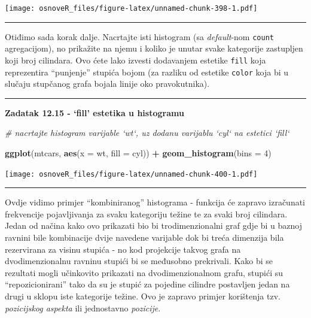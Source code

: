 \documentclass[]{book}
\newenvironment{Shaded}{\begin{snugshade}}{\end{snugshade}}
\newcommand{\KeywordTok}[1]{\textcolor[rgb]{0.13,0.29,0.53}{\textbf{#1}}}
\newcommand{\DataTypeTok}[1]{\textcolor[rgb]{0.13,0.29,0.53}{#1}}
\newcommand{\DecValTok}[1]{\textcolor[rgb]{0.00,0.00,0.81}{#1}}
\newcommand{\StringTok}[1]{\textcolor[rgb]{0.31,0.60,0.02}{#1}}
\newcommand{\CommentTok}[1]{\textcolor[rgb]{0.56,0.35,0.01}{\textit{#1}}}
\newcommand{\OperatorTok}[1]{\textcolor[rgb]{0.81,0.36,0.00}{\textbf{#1}}}
\newcommand{\NormalTok}[1]{#1}
\theoremstyle{definition}
\theoremstyle{definition}
\theoremstyle{definition}
\theoremstyle{remark}
\begin{document}
\texttt{[image: osnoveR\_files/figure-latex/unnamed-chunk-398-1.pdf]}

\begin{center}\rule{0.5\linewidth}{\linethickness}\end{center}

Otiđimo sada korak dalje. Nacrtajte isti histogram (sa
\emph{default}-nom \texttt{count} agregacijom), no prikažite na njemu i
koliko je unutar svake kategorije zastupljen koji broj cilindara. Ovo
ćete lako izvesti dodavanjem estetike \texttt{fill} koja reprezentira
``punjenje'' stupića bojom (za razliku od estetike \texttt{color} koja
bi u slučaju stupčanog grafa bojala linije oko pravokutnika).

\begin{center}\rule{0.5\linewidth}{\linethickness}\end{center}

\textbf{Zadatak 12.15 - `fill' estetika u histogramu}

\begin{Shaded}
\begin{Highlighting}[]
\CommentTok{# nacrtajte histogram varijable `wt`, uz dodanu varijablu `cyl` na estetici `fill`}
\end{Highlighting}
\end{Shaded}

\begin{Shaded}
\begin{Highlighting}[]
\KeywordTok{ggplot}\NormalTok{(mtcars, }\KeywordTok{aes}\NormalTok{(}\DataTypeTok{x =}\NormalTok{ wt, }\DataTypeTok{fill =}\NormalTok{ cyl)) }\OperatorTok{+}\StringTok{ }\KeywordTok{geom_histogram}\NormalTok{(}\DataTypeTok{bins =} \DecValTok{4}\NormalTok{)}
\end{Highlighting}
\end{Shaded}

\texttt{[image: osnoveR\_files/figure-latex/unnamed-chunk-400-1.pdf]}

\begin{center}\rule{0.5\linewidth}{\linethickness}\end{center}

Ovdje vidimo primjer ``kombiniranog'' histograma - funkcija će zapravo
izračunati frekvencije pojavljivanja za svaku kategoriju težine te za
svaki broj cilindara. Jedan od načina kako ovo prikazati bio bi
trodimenzionalni graf gdje bi u baznoj ravnini bile kombinacije dvije
navedene varijable dok bi treća dimenzija bila rezervirana za visinu
stupića - no kod projekcije takvog grafa na dvodimenzionalnu ravninu
stupići bi se međusobno prekrivali. Kako bi se rezultati mogli
učinkovito prikazati na dvodimenzionalnom grafu, stupići su
``repozicionirani'' tako da su je stupić za pojedine cilindre postavljen
jedan na drugi u sklopu iste kategorije težine. Ovo je zapravo primjer
korištenja tzv. \emph{pozicijskog aspekta} ili jednostavno
\emph{pozicije}.
\end{document}
